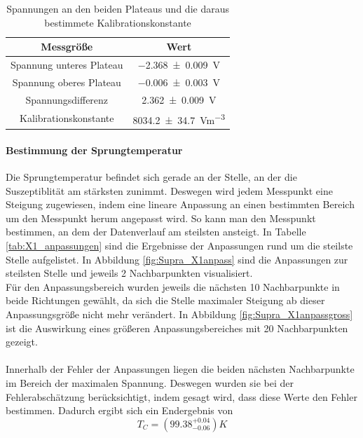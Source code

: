 \documentclass[12pt,a4paper]{article}
\begin{document}
\begin{table}
\centering
\begin{tabular}{|c|c|}
\hline 
Messgröße & Wert \\ 
\hline 
Spannung unteres Plateau & \SI{-2.368\pm 0.009}{V} \\ 
\hline 
Spannung oberes Plateau & \SI{-0.006\pm 0.003}{V} \\ 
\hline 
Spannungsdifferenz & \SI{2.362\pm 0.009}{V} \\ 
\hline 
Kalibrationskonstante & \SI{8034.2\pm 34.7}{Vm^{-3}} \\ 
\hline 
\end{tabular} 
\caption{Spannungen an den beiden Plateaus und die daraus bestimmete Kalibrationskonstante}
\label{tab:X1_const}
\end{table}

\paragraph{Bestimmung der Sprungtemperatur}
Die Sprungtemperatur befindet sich gerade an der Stelle, an der die Suszeptiblität am stärksten zunimmt. Deswegen wird jedem Messpunkt eine Steigung zugewiesen, indem eine lineare Anpassung an einen bestimmten Bereich um den Messpunkt herum angepasst wird. So kann man den Messpunkt bestimmen, an dem der Datenverlauf am steilsten ansteigt. In Tabelle \ref{tab:X1_anpassungen} sind die Ergebnisse der Anpassungen rund um die steilste Stelle aufgelistet. In Abbildung
\ref{fig:Supra_X1anpass} sind die Anpassungen zur steilsten Stelle und jeweils 2 Nachbarpunkten visualisiert.\\
Für den Anpassungsbereich wurden jeweils die nächsten 10 Nachbarpunkte in beide Richtungen gewählt, da sich die Stelle maximaler Steigung ab dieser Anpassungsgröße nicht mehr verändert. In Abbildung \ref{fig:Supra_X1anpassgross} ist die Auswirkung eines größeren Anpassungsbereiches mit 20 Nachbarpunkten gezeigt.\\
\\
Innerhalb der Fehler der Anpassungen liegen die beiden nächsten Nachbarpunkte im Bereich der maximalen Spannung. Deswegen wurden sie bei der Fehlerabschätzung berücksichtigt, indem gesagt wird, dass diese Werte den Fehler bestimmen. Dadurch ergibt sich ein Endergebnis von
\begin{equation*}
T_C = (99.38^{+0.04}_{-0.06}) K
\end{equation*}
\end{document}
